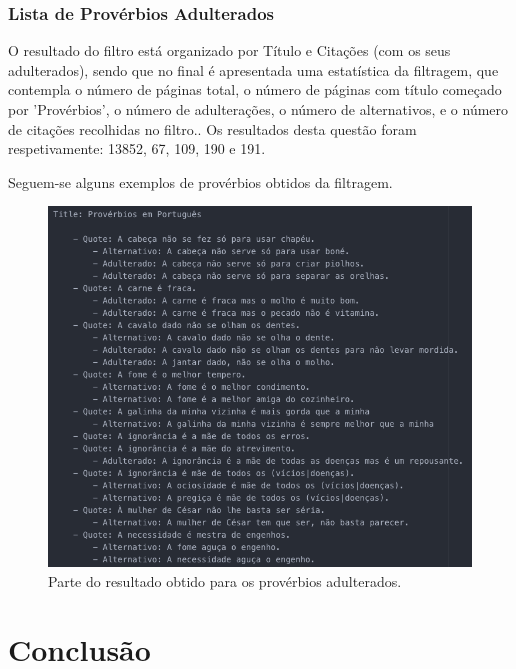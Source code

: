 \documentclass[11pt,a4paper]{report}
\begin{document}
\subsection{Lista de Provérbios Adulterados}

O resultado do filtro está organizado por Título e Citações (com os seus adulterados), sendo que no final é apresentada uma estatística da filtragem, que contempla o número de páginas total, o número de páginas com título começado por 'Provérbios', o número de adulterações, o número de alternativos, e o número de citações recolhidas no filtro.. Os resultados desta questão foram respetivamente: 13852, 67, 109, 190 e 191.

Seguem-se alguns exemplos de provérbios obtidos da filtragem.

\begin{figure}[H]
\centering
\includegraphics[scale=0.60]{proverbios_adulterados.png}
\caption{Parte do resultado obtido para os provérbios adulterados.}
\label{img:autor}
\end{figure}



\chapter{Conclusão}
\label{chap:concl}
\end{document}
